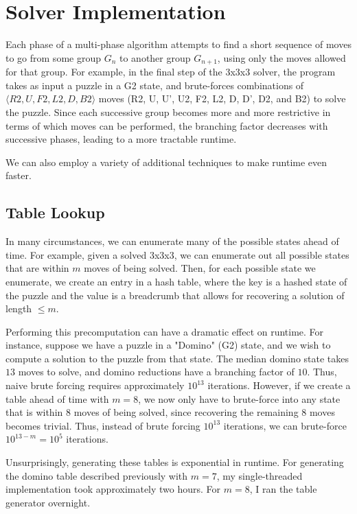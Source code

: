 \documentclass{article}
\begin{document}

\section{Solver Implementation}

Each phase of a multi-phase algorithm attempts to find a short sequence of moves to go from some group $G_n$ to another group $G_{n+1}$, using only the moves allowed for that group. For example, in the final step of the 3x3x3 solver, the program takes as input a puzzle in a G2 state, and brute-forces combinations of $\langle R2, U, F2, L2, D, B2 \rangle$ moves (R2, U, U', U2, F2, L2, D, D', D2, and B2) to solve the puzzle. Since each successive group becomes more and more restrictive in terms of which moves can be performed, the branching factor decreases with successive phases, leading to a more tractable runtime.

We can also employ a variety of additional techniques to make runtime even faster.

\subsection{Table Lookup}

In many circumstances, we can enumerate many of the possible states ahead of time. For example, given a solved 3x3x3, we can enumerate out all possible states that are within $m$ moves of being solved. Then, for each possible state we enumerate, we create an entry in a hash table, where the key is a hashed state of the puzzle and the value is a breadcrumb that allows for recovering a solution of length $\leq m$.

Performing this precomputation can have a dramatic effect on runtime. For instance, suppose we have a puzzle in a "Domino" (G2) state, and we wish to compute a solution to the puzzle from that state. The median domino state takes $13$ moves to solve, and domino reductions have a branching factor of $10$. Thus, naive brute forcing requires approximately $10^{13}$ iterations. However, if we create a table ahead of time with $m=8$, we now only have to brute-force into any state that is within $8$ moves of being solved, since recovering the remaining $8$ moves becomes trivial. Thus, instead of brute forcing $10^{13}$ iterations, we can brute-force $10^{13-m} = 10^5$ iterations.

Unsurprisingly, generating these tables is exponential in runtime. For generating the domino table described previously with $m=7$, my single-threaded implementation took approximately two hours. For $m=8$, I ran the table generator overnight.
\end{document}
